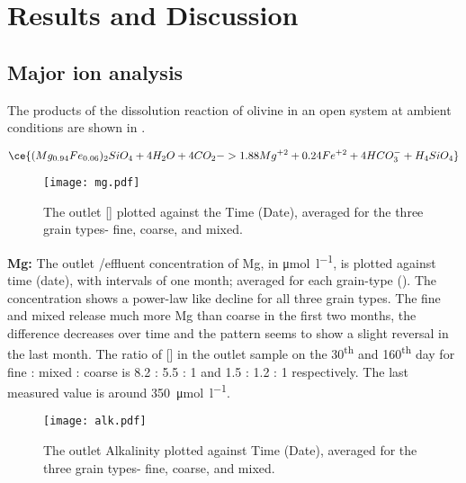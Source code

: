 \chapter{Results and Discussion}
\section{Major ion analysis}\label{sec:major_ion}
The products of the dissolution reaction of olivine in an open system at ambient conditions are shown in . 

\begin{equation} \label{eq:results_olivine}
\ce{(Mg_{0.94}Fe_{0.06})_{2}SiO_{4} + 4H_2O + 4CO_2 -> 1.88Mg^{+2} + 0.24Fe^{+2} + 4HCO_3^- + H_4SiO_4}
\end{equation}

\begin{figure}[h]
\centering
\texttt{[image: mg.pdf]}
\caption{The outlet [] plotted against the Time (Date), averaged for the three grain types- fine, coarse, and mixed.}
\label{fig:results_mg1}
\end{figure}

\noindent \textbf{Mg:} The outlet /effluent concentration of Mg, in \si{\micro\mole\per\litre}, is plotted against time (date), with intervals of one month; averaged for each grain-type (). The concentration shows a power-law like decline for all three grain types. The fine and mixed release much more Mg than coarse in the first two months, the difference decreases over time and the pattern seems to show a slight reversal in the last month. The ratio of [] in the outlet sample on the 30\textsuperscript{th} and 160\textsuperscript{th} day for fine : mixed : coarse is 8.2 : 5.5 : 1 and 1.5 : 1.2 : 1 respectively. The last measured value is around \SI{350}{\micro\mole\per\litre}.\\

\begin{figure}[h]
\centering
\texttt{[image: alk.pdf]}
\caption{The outlet Alkalinity plotted against Time (Date), averaged for the three grain types- fine, coarse, and mixed.}
\label{fig:results_alk}
\end{figure}

